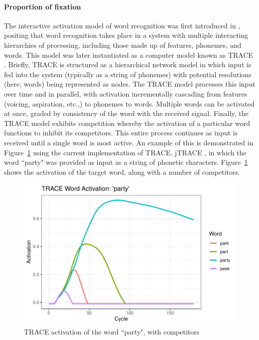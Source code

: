 \documentclass{article}
\begin{document}
\paragraph{Proportion of fixation} The interactive activation model of word recognition was first introduced in \citet{McClelland1981}, positing that word recognition takes place in a system with multiple interacting hierarchies of processing, including those made up of features, phonemes, and words. This model was later instantiated as a computer model known as TRACE \citep{elman1985speech}. Briefly, TRACE is structured as a hierarchical network model in which input is fed into the system (typically as a string of phonemes) with potential resolutions (here, words) being represented as nodes. The TRACE model processes this input over time and in parallel, with activation incrementally cascading from features (voicing, aspiration, etc.,) to phonemes to words. Multiple words can be activated at once, graded by consistency of the word with the received signal. Finally, the TRACE model exhibits competition whereby the activation of a particular word functions to inhibit its competitors. This entire process continues as input is received until a single word is most active. An example of this is demonstrated in Figure~\ref{fig:trace_plot} using the current implementation of TRACE, jTRACE \citep{Strauss2007}, in which the word ``party" was provided as input as a string of phonetic characters. Figure~\ref{fig:trace_plot} shows the activation of the target word, along with a number of competitors.

\begin{figure}[H]
\centering
\includegraphics[scale=1]{trace_plot}
\caption{TRACE activation of the word ``party", with competitors}
\label{fig:trace_plot}
\end{figure}
\end{document}
